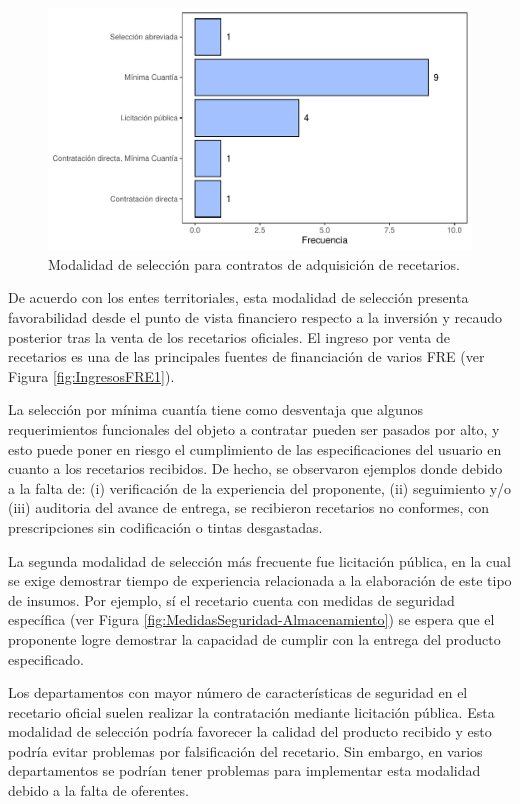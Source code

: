 \documentclass[
  oneside]{book}
\begin{document}
\begin{figure}

{\centering \includegraphics[width=0.85\linewidth]{InformeFinal_files/figure-latex/modalidadAdquisicion-1} 

}

\caption{Modalidad de selección para contratos de adquisición de recetarios.}\label{fig:modalidadAdquisicion}
\end{figure}

De acuerdo con los entes territoriales, esta modalidad de selección presenta favorabilidad desde el punto de vista financiero respecto a la inversión y recaudo posterior tras la venta de los recetarios oficiales. El ingreso por venta de recetarios es una de las principales fuentes de financiación de varios FRE (ver Figura \ref{fig:IngresosFRE1}).

La selección por mínima cuantía tiene como desventaja que algunos requerimientos funcionales del objeto a contratar pueden ser pasados por alto, y esto puede poner en riesgo el cumplimiento de las especificaciones del usuario en cuanto a los recetarios recibidos. De hecho, se observaron ejemplos donde debido a la falta de: (i) verificación de la experiencia del proponente, (ii) seguimiento y/o (iii) auditoria del avance de entrega, se recibieron recetarios no conformes, con prescripciones sin codificación o tintas desgastadas.

La segunda modalidad de selección más frecuente fue licitación pública, en la cual se exige demostrar tiempo de experiencia relacionada a la elaboración de este tipo de insumos. Por ejemplo, sí el recetario cuenta con medidas de seguridad específica (ver Figura \ref{fig:MedidasSeguridad-Almacenamiento}) se espera que el proponente logre demostrar la capacidad de cumplir con la entrega del producto especificado.

Los departamentos con mayor número de características de seguridad en el recetario oficial suelen realizar la contratación mediante licitación pública. Esta modalidad de selección podría favorecer la calidad del producto recibido y esto podría evitar problemas por falsificación del recetario. Sin embargo, en varios departamentos se podrían tener problemas para implementar esta modalidad debido a la falta de oferentes.
\end{document}
